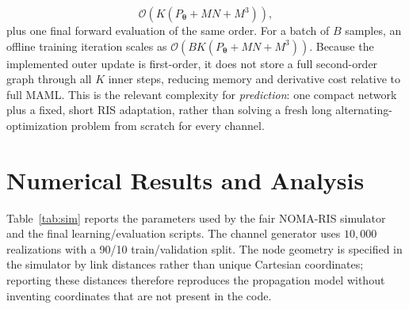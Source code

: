 \begin{equation}
\mathcal O\!\left(K(P_{\bm\theta}+MN+M^3)\right), \label{eq:onlinecomplex}
\end{equation}
plus one final forward evaluation of the same order. For a batch of $B$ samples,
an offline training iteration scales as
$\mathcal O(BK(P_{\bm\theta}+MN+M^3))$. Because the implemented outer update is
first-order, it does not store a full second-order graph through all $K$ inner
steps, reducing memory and derivative cost relative to full MAML. This is the
relevant complexity for \emph{prediction}: one compact network plus a fixed,
short RIS adaptation, rather than solving a fresh long alternating-optimization
problem from scratch for every channel.

\section{Numerical Results and Analysis}
Table~\ref{tab:sim} reports the parameters used by the fair NOMA-RIS simulator
and the final learning/evaluation scripts. The channel generator uses
$10{,}000$ realizations with a 90/10 train/validation split. The node geometry is
specified in the simulator by link distances rather than unique Cartesian
coordinates; reporting these distances therefore reproduces the propagation
model without inventing coordinates that are not present in the code.

